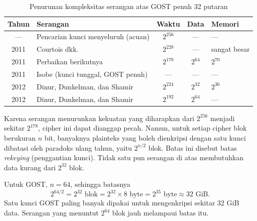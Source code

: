 \begin{table}[htbp]
    \centering
    \begin{tabular}{@{}c l c c l@{}}
    \toprule
    \textbf{Tahun} & \textbf{Serangan} & \textbf{Waktu} & \textbf{Data} & \textbf{Memori} \\
    \midrule
    ---  & Pencarian kunci menyeluruh (acuan) & $2^{256}$ & --- & --- \\
    2011 & Courtois dkk.                     & $2^{228}$ & --- & sangat besar \\
    2011 & Perbaikan berikutnya              & $2^{178}$ & $2^{64}$ & $2^{70}$ \\
    2011 & Isobe (kunci tunggal, GOST penuh) & --- & --- & --- \\
    2012 & Dinur, Dunkelman, dan Shamir      & $2^{224}$ & $2^{32}$ & $2^{36}$ \\
    2012 & Dinur, Dunkelman, dan Shamir      & $2^{192}$ & $2^{64}$ & --- \\
    \bottomrule
    \end{tabular}
    \caption{Penurunan kompleksitas serangan atas GOST penuh 32 putaran}
    \label{tab:kompleksitas-serangan-gost}
\end{table}

Karena serangan menurunkan kekuatan yang diharapkan dari $2^{256}$ menjadi sekitar
$2^{178}$, cipher ini dapat dianggap pecah. Namun, untuk setiap cipher blok
berukuran $n$ bit, banyaknya plainteks yang boleh dienkripsi dengan satu kunci
dibatasi oleh paradoks ulang tahun, yaitu $2^{n/2}$ blok. Batas ini disebut batas
\textit{rekeying} (penggantian kunci). Tidak satu pun serangan di atas
membutuhkan data kurang dari $2^{32}$ blok.

Untuk GOST, $n = 64$, sehingga batasnya
\[
2^{64/2} = 2^{32} \text{ blok} = 2^{32} \times 8 \text{ byte} = 2^{35} \text{ byte}
\approx 32 \text{ GiB}.
\]
Satu kunci GOST paling banyak dipakai untuk mengenkripsi sekitar 32 GiB data.
Serangan yang menuntut $2^{64}$ blok jauh melampaui batas itu.

